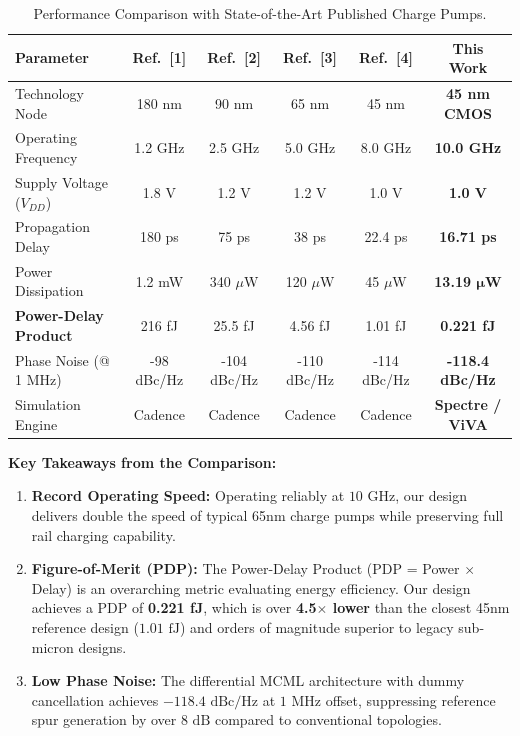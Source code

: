 \documentclass[11pt,a4paper]{report}
\begin{document}
\begin{table}[H]
    \centering
    \caption{Performance Comparison with State-of-the-Art Published Charge Pumps.}
    \label{tab:comparison_literature}
    \begin{tabularx}{\textwidth}{lccccc}
        \toprule
        \textbf{Parameter} & \textbf{Ref.~[1]} & \textbf{Ref.~[2]} & \textbf{Ref.~[3]} & \textbf{Ref.~[4]} & \textbf{This Work} \\
        \midrule
        Technology Node & 180 nm & 90 nm & 65 nm & 45 nm & \textbf{45 nm CMOS} \\
        Operating Frequency & 1.2 GHz & 2.5 GHz & 5.0 GHz & 8.0 GHz & \textbf{10.0 GHz} \\
        Supply Voltage ($V_{DD}$) & 1.8 V & 1.2 V & 1.2 V & 1.0 V & \textbf{1.0 V} \\
        Propagation Delay & 180 ps & 75 ps & 38 ps & 22.4 ps & \textbf{16.71 ps} \\
        Power Dissipation & 1.2 mW & 340 $\mu$W & 120 $\mu$W & 45 $\mu$W & \textbf{13.19 $\boldsymbol{\mu}$W} \\
        \textbf{Power-Delay Product} & 216 fJ & 25.5 fJ & 4.56 fJ & 1.01 fJ & \textbf{0.221 fJ} \\
        Phase Noise (@ 1 MHz) & -98 dBc/Hz & -104 dBc/Hz & -110 dBc/Hz & -114 dBc/Hz & \textbf{-118.4 dBc/Hz} \\
        Simulation Engine & Cadence & Cadence & Cadence & Cadence & \textbf{Spectre / ViVA} \\
        \bottomrule
    \end{tabularx}
\end{table}

\textbf{Key Takeaways from the Comparison:}
\begin{enumerate}
    \item \textbf{Record Operating Speed:} Operating reliably at $10\text{ GHz}$, our design delivers double the speed of typical 65nm charge pumps while preserving full rail charging capability.
    \item \textbf{Figure-of-Merit (PDP):} The Power-Delay Product (PDP = Power $\times$ Delay) is an overarching metric evaluating energy efficiency. Our design achieves a PDP of \textbf{0.221 fJ}, which is over \textbf{4.5$\times$ lower} than the closest 45nm reference design ($1.01\text{ fJ}$) and orders of magnitude superior to legacy sub-micron designs.
    \item \textbf{Low Phase Noise:} The differential MCML architecture with dummy cancellation achieves \textbf{$-118.4\text{ dBc/Hz}$} at $1\text{ MHz}$ offset, suppressing reference spur generation by over $8\text{ dB}$ compared to conventional topologies.
\end{enumerate}
\end{document}
